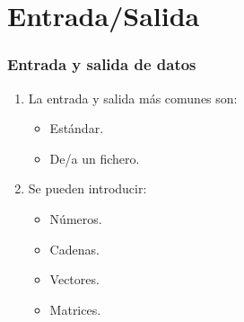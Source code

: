 \section{Entrada/Salida}
\begin{frame}[label=io]
 \frametitle{Entrada y salida de datos}
 \begin{enumerate}
   \item La entrada y salida más comunes son:
   \begin{itemize}
    \item Estándar.
    \item De/a un fichero.
   \end{itemize}
   \item Se pueden introducir:
   \begin{itemize}
    \item Números.
    \item Cadenas.
    \item Vectores.
    \item Matrices.
   \end{itemize}
 \end{enumerate}
\end{frame}
